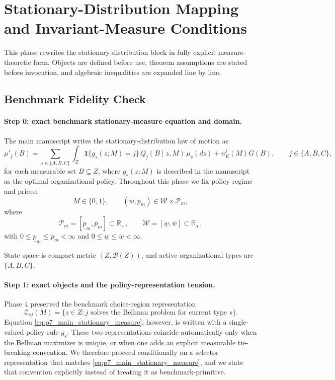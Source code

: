 \section{Stationary-Distribution Mapping and Invariant-Measure Conditions}

This phase rewrites the stationary-distribution block in fully explicit measure-theoretic form. Objects are defined before use, theorem assumptions are stated before invocation, and algebraic inequalities are expanded line by line.

\subsection{Benchmark Fidelity Check}

\paragraph{Step 0: exact benchmark stationary-measure equation and domain.}
The main manuscript writes the stationary-distribution law of motion as
\begin{equation}
\mu'_j(B)
=
\sum_{s\in\{A,B,C\}}\int_Z \mathbf 1\{g_s(z;M)=j\}\,Q_j(B\mid z,M)\,\mu_s(dz)
+n_E^j(M)G(B),
\qquad j\in\{A,B,C\},
\label{eq:p7_main_stationary_measure}
\end{equation}
for each measurable set $B\subseteq Z$, where $g_s(z;M)$ is described in the manuscript as the optimal organizational policy. Throughout this phase we fix policy regime and prices:
\[
M\in\{0,1\},
\qquad
(w,p_m)\in\mathcal W\times\mathcal P_m,
\]
where
\[
\mathcal P_m=[\underline p_m,\overline p_m]\subset\mathbb R_+,
\qquad
\mathcal W=[\underline w,\overline w]\subset\mathbb R_+,
\]
with $0\le\underline p_m\le\overline p_m<\infty$ and $0\le\underline w\le\overline w<\infty$.

State space is compact metric $(Z,\mathcal B(Z))$, and active organizational types are $\{A,B,C\}$.

\paragraph{Step 1: exact objects and the policy-representation tension.}
Phase 4 preserved the benchmark choice-region representation
\[
\mathcal Z_{sj}(M)=\{z\in Z: j \text{ solves the Bellman problem for current type }s\}.
\]
Equation \eqref{eq:p7_main_stationary_measure}, however, is written with a single-valued policy rule $g_s$. These two representations coincide automatically only when the Bellman maximizer is unique, or when one adds an explicit measurable tie-breaking convention. We therefore proceed conditionally on a selector representation that matches \eqref{eq:p7_main_stationary_measure}, and we state that convention explicitly instead of treating it as benchmark-primitive.

